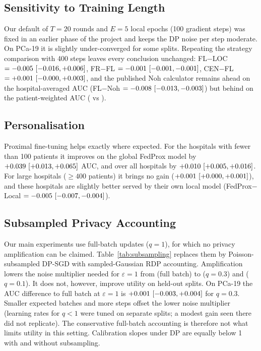 

\subsection{Sensitivity to Training Length}
Our default of $T=20$ rounds and $E=5$ local epochs (100 gradient steps) was fixed in an earlier phase of the project and keeps the DP noise per step moderate. On PCa-19 it is slightly under-converged for some splits. Repeating the strategy comparison with 400 steps leaves every conclusion unchanged: FL$-$LOC $=-0.005\ [-0.016, +0.006]$, FR$-$FL $=-0.001\ [-0.001, -0.001]$, CEN$-$FL $=+0.001\ [-0.000, +0.003]$, and the published Noh calculator remains ahead on the hospital-averaged AUC (FL$-$Noh $=-0.008\ [-0.013, -0.003]$) but behind on the patient-weighted AUC (\cvgWFL{} vs \cvgWNoh{}).

\subsection{Personalisation}
Proximal fine-tuning helps exactly where expected. For the \pNSmall{} hospitals with fewer than 100 patients it improves on the global FedProx model by $+0.039\ [+0.013, +0.065]$ AUC, and over all hospitals by $+0.010\ [+0.005, +0.016]$. For large hospitals ($\geq 400$ patients) it brings no gain ($+0.001\ [+0.000, +0.001]$), and these hospitals are slightly better served by their own local model (FedProx$-$Local $=-0.005\ [-0.007, -0.004]$).

\subsection{Subsampled Privacy Accounting}
\label{sec:p19_subsampling}
Our main experiments use full-batch updates ($q=1$), for which no privacy amplification can be claimed. Table~\ref{tab:subsampling} replaces them by Poisson-subsampled DP-SGD with sampled-Gaussian RDP accounting. Amplification lowers the noise multiplier needed for $\varepsilon=1$ from \ssSigFull{} (full batch) to \ssSigThree{} ($q=0.3$) and \ssSigOne{} ($q=0.1$). It does not, however, improve utility on held-out splits. On PCa-19 the AUC difference to full batch at $\varepsilon=1$ is $+0.001\ [-0.003, +0.004]$ for $q=0.3$. Smaller expected batches and more steps offset the lower noise multiplier (learning rates for $q<1$ were tuned on separate splits; a modest gain seen there did not replicate). The conservative full-batch accounting is therefore not what limits utility in this setting. Calibration slopes under DP are equally below 1 with and without subsampling.




